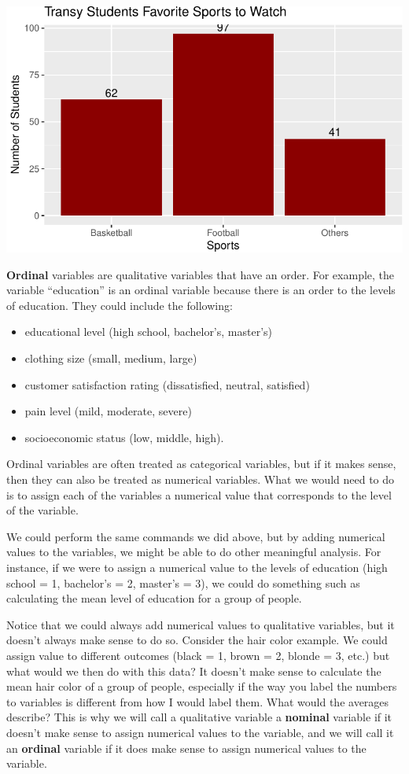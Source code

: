\documentclass[
  letterpaper,
  DIV=11,
  numbers=noendperiod]{scrreprt}
\providecommand{\tightlist}{%
  \setlength{\itemsep}{0pt}\setlength{\parskip}{0pt}}\usepackage{longtable,booktabs,array}
\begin{document}
\includegraphics{Qualitative_and_Quantitative_Variables_files/figure-pdf/unnamed-chunk-2-1.pdf}

\textbf{Ordinal} variables are qualitative variables that have an order.
For example, the variable ``education'' is an ordinal variable because
there is an order to the levels of education. They could include the
following:

\begin{itemize}
\tightlist
\item
  educational level (high school, bachelor's, master's)
\item
  clothing size (small, medium, large)
\item
  customer satisfaction rating (dissatisfied, neutral, satisfied)
\item
  pain level (mild, moderate, severe)
\item
  socioeconomic status (low, middle, high).
\end{itemize}

Ordinal variables are often treated as categorical variables, but if it
makes sense, then they can also be treated as numerical variables. What
we would need to do is to assign each of the variables a numerical value
that corresponds to the level of the variable.

We could perform the same commands we did above, but by adding numerical
values to the variables, we might be able to do other meaningful
analysis. For instance, if we were to assign a numerical value to the
levels of education (high school = 1, bachelor's = 2, master's = 3), we
could do something such as calculating the mean level of education for a
group of people.

Notice that we could always add numerical values to qualitative
variables, but it doesn't always make sense to do so. Consider the hair
color example. We could assign value to different outcomes (black = 1,
brown = 2, blonde = 3, etc.) but what would we then do with this data?
It doesn't make sense to calculate the mean hair color of a group of
people, especially if the way you label the numbers to variables is
different from how I would label them. What would the averages describe?
This is why we will call a qualitative variable a \textbf{nominal}
variable if it doesn't make sense to assign numerical values to the
variable, and we will call it an \textbf{ordinal} variable if it does
make sense to assign numerical values to the variable.
\end{document}
